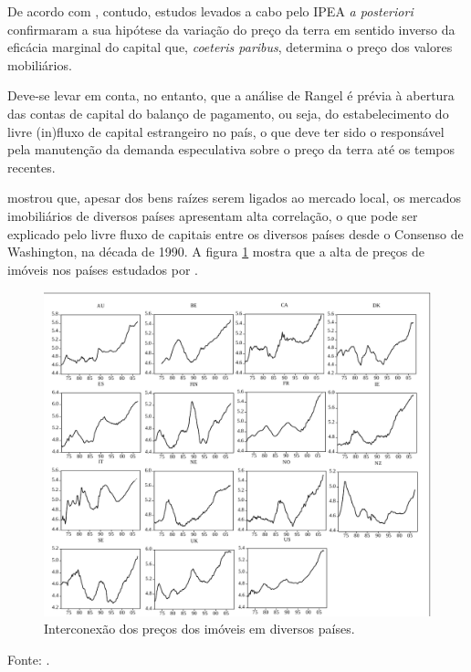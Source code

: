 \documentclass[
	12pt,				%
	oneside,			%
	a4paper,			%
	chapter=TITLE,		%
	section=TITLE,		%
	english,			%
	brazil				%
	]{abntex2}
\newcommand{\bcenter}{\begin{center}}
\newcommand{\ecenter}{\end{center}}
\begin{document}
De acordo com \textcite{rangel1986b}, contudo, estudos levados a cabo
pelo IPEA \emph{a posteriori} confirmaram a sua hipótese da variação do
preço da terra em sentido inverso da eficácia marginal do capital que,
\emph{coeteris paribus}, determina o preço dos valores mobiliários.

Deve-se levar em conta, no entanto, que a análise de Rangel é prévia à
abertura das contas de capital do balanço de pagamento, ou seja, do
estabelecimento do livre (in)fluxo de capital estrangeiro no país, o que
deve ter sido o responsável pela manutenção da demanda especulativa
sobre o preço da terra até os tempos recentes.

\textcite{ADAMS201038} mostrou que, apesar dos bens raízes serem ligados
ao mercado local, os mercados imobiliários de diversos países apresentam
alta correlação, o que pode ser explicado pelo livre fluxo de capitais
entre os diversos países desde o Consenso de Washington, na década de
1990. A figura \ref{fig:adams2} mostra que a alta de preços de imóveis
nos países estudados por \textcite{ADAMS201038}.
\begin{figure}[H]

{\centering \includegraphics[width=\textwidth]{./images/adams2_crop} 

}

\caption{Interconexão dos preços dos imóveis em diversos países.}\label{fig:adams2}
\end{figure}
\bcenter
Fonte: \textcite{ADAMS201038}. \ecenter
\end{document}

